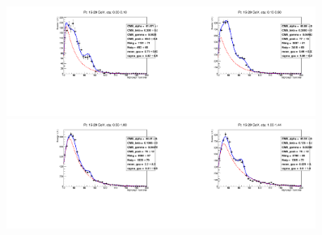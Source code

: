 \begin{figure}[htb]
  \begin{center}
   \includegraphics[width=0.45\textwidth]{../figs/figs_v11/ELECTRON_WGamma/EtoGammaFits/sa_hZmass_h_Data_EtoGamma_Enr_BARREL_pt15to20_ieta0.pdf}\includegraphics[width=0.45\textwidth]{../figs/figs_v11/ELECTRON_WGamma/EtoGammaFits/sa_hZmass_h_Data_EtoGamma_Enr_BARREL_pt15to20_ieta1.pdf}\\
   \includegraphics[width=0.45\textwidth]{../figs/figs_v11/ELECTRON_WGamma/EtoGammaFits/sa_hZmass_h_Data_EtoGamma_Enr_BARREL_pt15to20_ieta2.pdf}\includegraphics[width=0.45\textwidth]{../figs/figs_v11/ELECTRON_WGamma/EtoGammaFits/sa_hZmass_h_Data_EtoGamma_Enr_BARREL_pt15to20_ieta3.pdf}\\

\end{center}
\end{figure}
